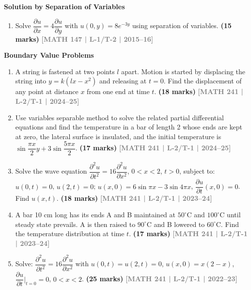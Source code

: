 \documentclass[12pt,a4paper]{article}
\newcommand{\yr}[1]{\hfill\textcolor{gray}{\small\textbf{[#1]}}}
\newcommand{\mk}[1]{\textcolor{orange!70!black}{\small\textbf{(#1 marks)}}}
\newcommand{\subtopic}[2]{%
  \vspace{10pt}
  \noindent\begin{tcolorbox}[colback=#1!8,colframe=#1,boxrule=0.6pt,arc=4pt,
    left=6pt,right=6pt,top=4pt,bottom=4pt]
    \small\bfseries\textcolor{#1}{#2}
  \end{tcolorbox}
  \vspace{2pt}
}
\begin{document}
\subtopic{cF}{Solution by Separation of Variables}
\label{sub:s6-separation}

\begin{enumerate}\item Solve $\dfrac{\partial u}{\partial x}=4\dfrac{\partial u}{\partial y}$ with $u(0,y)=8e^{-3y}$ using separation of variables.
\mk{15} \yr{MATH 147 | L-1/T-2 | 2015--16}

\end{enumerate}

\subtopic{cF}{Boundary Value Problems}
\label{sub:s6-bvp}

\begin{enumerate}\item A string is fastened at two points $l$ apart. Motion is started by displacing the string into $y=k(lx-x^{2})$ and releasing at $t=0$. Find the displacement of any point at distance $x$ from one end at time $t$.
\mk{18} \yr{MATH 241 | L-2/T-1 | 2024--25}

\item Use variables separable method to solve the related partial differential equations and find the temperature in a bar of length 2 whose ends are kept at zero, the lateral surface is insulated, and the initial temperature is $\sin\dfrac{\pi x}{2}y+3\sin\dfrac{5\pi x}{2}$.
\mk{17} \yr{MATH 241 | L-2/T-1 | 2024--25}

\item Solve the wave equation $\dfrac{\partial^{2}u}{\partial t^{2}}=16\dfrac{\partial^{2}u}{\partial x^{2}}$, $0<x<2$, $t>0$, subject to: $u(0,t)=0$, $u(2,t)=0$; $u(x,0)=6\sin\pi x-3\sin 4\pi x$, $\dfrac{\partial u}{\partial t}(x,0)=0$. Find $u(x,t)$.
\mk{18} \yr{MATH 241 | L-2/T-1 | 2023--24}

\item A bar 10 cm long has its ends A and B maintained at $50^{\circ}$C and $100^{\circ}$C until steady state prevails. A is then raised to $90^{\circ}$C and B lowered to $60^{\circ}$C. Find the temperature distribution at time $t$.
\mk{17} \yr{MATH 241 | L-2/T-1 | 2023--24}

\item Solve: $\dfrac{\partial^{2}u}{\partial t^{2}}=16\dfrac{\partial^{2}u}{\partial x^{2}}$ with $u(0,t)=u(2,t)=0$, $u(x,0)=x(2-x)$, $\dfrac{\partial u}{\partial t}\big|_{t=0}=0$, $0<x<2$.
\mk{25} \yr{MATH 241 | L-2/T-1 | 2022--23}


\end{enumerate}
\end{document}

